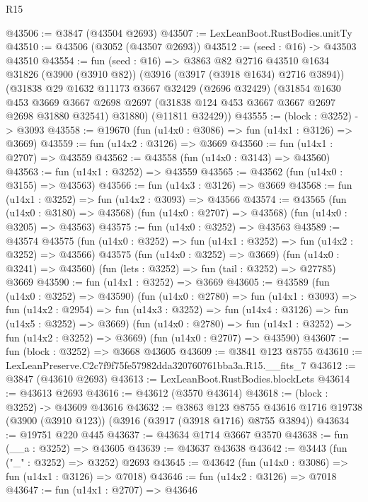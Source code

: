\begin{lexlean}{R15}
\begin{coremodule}
@43506 := @3847 (@43504 @2693)
@43507 := LexLeanBoot.RustBodies.unitTy
@43510 := @43506 (@3052 (@43507 @2693))
@43512 := (seed : @16) -> @43503 @43510
@43554 := fun (seed : @16) =>
  @3863
    @82
    @2716
    @43510
    @1634
    @31826
    (@3900 (@3910 @82))
    (@3916 (@3917 (@3918 @1634) @2716 @3894))
    (@31838
      @29
      @1632
      @11173
      @3667
      @32429
      (@2696 @32429)
      (@31854
        @1630
        @453
        @3669
        @3667
        @2698
        @2697
        (@31838 @124 @453 @3667 @3667 @2697 @2698 @31880 @32541)
        @31880)
      (@11811 @32429))
@43555 := (block : @3252) -> @3093
@43558 := @19670 (fun (u14x0 : @3086) => fun (u14x1 : @3126) => @3669)
@43559 := fun (u14x2 : @3126) => @3669
@43560 := fun (u14x1 : @2707) => @43559
@43562 := @43558 (fun (u14x0 : @3143) => @43560)
@43563 := fun (u14x1 : @3252) => @43559
@43565 := @43562 (fun (u14x0 : @3155) => @43563)
@43566 := fun (u14x3 : @3126) => @3669
@43568 := fun (u14x1 : @3252) => fun (u14x2 : @3093) => @43566
@43574 := @43565
    (fun (u14x0 : @3180) => @43568)
    (fun (u14x0 : @2707) => @43568)
    (fun (u14x0 : @3205) => @43563)
@43575 := fun (u14x0 : @3252) => @43563
@43589 := @43574
    @43575
    (fun (u14x0 : @3252) => fun (u14x1 : @3252) => fun (u14x2 : @3252) => @43566)
    @43575
    (fun (u14x0 : @3252) => @3669)
    (fun (u14x0 : @3241) => @43560)
    (fun (lets : @3252) => fun (tail : @3252) => @27785)
    @3669
@43590 := fun (u14x1 : @3252) => @3669
@43605 := @43589
    (fun (u14x0 : @3252) => @43590)
    (fun (u14x0 : @2780) =>
    fun (u14x1 : @3093) =>
    fun (u14x2 : @2954) =>
    fun (u14x3 : @3252) => fun (u14x4 : @3126) => fun (u14x5 : @3252) => @3669)
    (fun (u14x0 : @2780) => fun (u14x1 : @3252) => fun (u14x2 : @3252) => @3669)
    (fun (u14x0 : @2707) => @43590)
@43607 := fun (block : @3252) => @3668 @43605
@43609 := @3841 @123 @8755
@43610 := LexLeanPreserve.C2c7f9f75fe57982dda320760761bba3a.R15.__fits_7
@43612 := @3847 (@43610 @2693)
@43613 := LexLeanBoot.RustBodies.blockLets
@43614 := @43613 @2693
@43616 := @43612 (@3570 @43614)
@43618 := (block : @3252) -> @43609 @43616
@43632 := @3863
    @123
    @8755
    @43616
    @1716
    @19738
    (@3900 (@3910 @123))
    (@3916 (@3917 (@3918 @1716) @8755 @3894))
@43634 := @19751 @220 @445
@43637 := @43634 @1714 @3667 @3570
@43638 := fun (__a : @3252) => @43605
@43639 := @43637 @43638
@43642 := @3443 (fun ("_" : @3252) => @3252) @2693
@43645 := @43642 (fun (u14x0 : @3086) => fun (u14x1 : @3126) => @7018)
@43646 := fun (u14x2 : @3126) => @7018
@43647 := fun (u14x1 : @2707) => @43646

\end{coremodule}
\end{lexlean}
